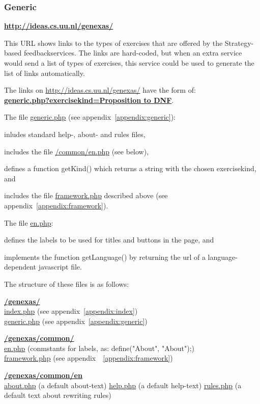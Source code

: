 \documentclass{article}
\begin{document}
\subsubsection{Generic}
\textbf{\url{http://ideas.cs.uu.nl/genexas/}} 

This URL shows links to the types of exercises that are
offered by the Strategy-based feedbackservices. The links are hard-coded, but when an
extra service would send a list of types of exercises, this service could be used to 
generate the list of links automatically.

The links on \url{http://ideas.cs.uu.nl/genexas/} have the form of:\\
\textbf{\url{generic.php?exercisekind=Proposition to DNF}}.

The file \url{generic.php} (see appendix~\ref{appendix:generic}):
\begin{compactitem}
\item inludes standard help-, about- and rules files, 
\item includes the file \url{/common/en.php} (see below),
\item defines a function getKind() which returns a string with the chosen exercisekind, and
\item includes the file \url{framework.php} described above (see appendix~\ref{appendix:framework}).
\end{compactitem}

The file \url{en.php}: 
\begin{compactitem}
\item defines the labels to be used for titles and buttons in the page, and
\item implements the function getLanguage() by returning the url of a language-dependent javascript file.
\end{compactitem}

The structure of these files is as follows:

\textbf{\url{/genexas/}} \\
 \url{index.php} (see appendix~\ref{appendix:index})\\
 \url{generic.php} (see appendix~\ref{appendix:generic})

\textbf{\url{/genexas/common/}}\\
 \url{en.php} (conmstants for labels, as: define("About", "About");)\\
 \url{framework.php} (see appendix~~\ref{appendix:framework}) 

\textbf{\url{/genexas/common/en}}\\
 \url{about.php} (a default about-text)
 \url{help.php} (a default help-text)
 \url{rules.php} (a default text about rewriting rules)
	
\end{document}

